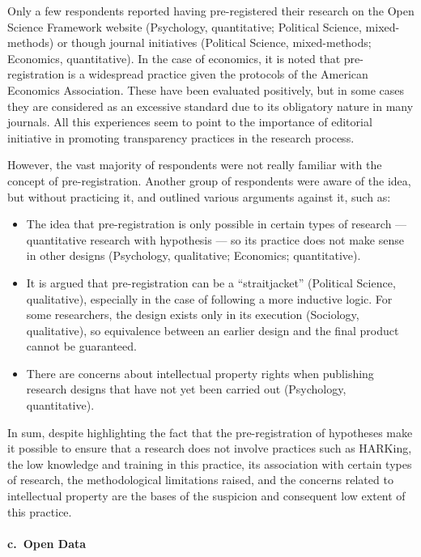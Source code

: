 \documentclass[
  letterpaper,
  DIV=11,
  numbers=noendperiod]{scrartcl}
\let\oldparagraph\paragraph
\renewcommand{\paragraph}[1]{\oldparagraph{#1}\mbox{}}
\begin{document}
Only a few respondents reported having pre-registered their research on
the Open Science Framework website (Psychology, quantitative; Political
Science, mixed-methods) or though journal initiatives (Political
Science, mixed-methods; Economics, quantitative). In the case of
economics, it is noted that pre-registration is a widespread practice
given the protocols of the American Economics Association. These have
been evaluated positively, but in some cases they are considered as an
excessive standard due to its obligatory nature in many journals. All
this experiences seem to point to the importance of editorial initiative
in promoting transparency practices in the research process.

However, the vast majority of respondents were not really familiar with
the concept of pre-registration. Another group of respondents were aware
of the idea, but without practicing it, and outlined various arguments
against it, such as:

\begin{itemize}
\item
  The idea that pre-registration is only possible in certain types of
  research --- quantitative research with hypothesis --- so its practice
  does not make sense in other designs (Psychology, qualitative;
  Economics; quantitative).
\item
  It is argued that pre-registration can be a ``straitjacket''
  (Political Science, qualitative), especially in the case of following
  a more inductive logic. For some researchers, the design exists only
  in its execution (Sociology, qualitative), so equivalence between an
  earlier design and the final product cannot be guaranteed.
\item
  There are concerns about intellectual property rights when publishing
  research designs that have not yet been carried out (Psychology,
  quantitative).
\end{itemize}

In sum, despite highlighting the fact that the pre-registration of
hypotheses make it possible to ensure that a research does not involve
practices such as HARKing, the low knowledge and training in this
practice, its association with certain types of research, the
methodological limitations raised, and the concerns related to
intellectual property are the bases of the suspicion and consequent low
extent of this practice.

\hypertarget{c.-open-data}{%
\paragraph{c.~Open Data}\label{c.-open-data}}
\end{document}
